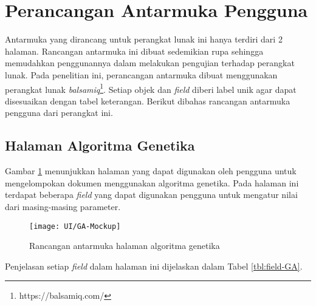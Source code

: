 \section{Perancangan Antarmuka Pengguna}
\label{sec:guidesign}
Antarmuka yang dirancang untuk perangkat lunak ini hanya terdiri dari 2 halaman. Rancangan antarmuka ini dibuat sedemikian rupa sehingga memudahkan penggunannya dalam melakukan pengujian terhadap perangkat lunak. Pada penelitian ini, perancangan antarmuka dibuat menggunakan perangkat lunak \textit{balsamiq}\footnote{https://balsamiq.com/}. Setiap objek dan \textit{field} diberi label unik agar dapat disesuaikan dengan tabel keterangan. Berikut dibahas rancangan antarmuka pengguna dari perangkat ini.

\subsection{Halaman Algoritma Genetika}
Gambar \ref{fig:UI-GA} menunjukkan halaman yang dapat digunakan oleh pengguna untuk mengelompokan dokumen menggunakan algoritma genetika. Pada halaman ini terdapat beberapa \textit{field} yang dapat digunakan pengguna untuk mengatur nilai dari masing-masing parameter.

\begin{figure}[H]
	\begin{center}
		\texttt{[image: UI/GA-Mockup]}
		\caption{Rancangan antarmuka halaman algoritma genetika}
		\label{fig:UI-GA}
	\end{center}
\end{figure}

Penjelasan setiap \textit{field} dalam halaman ini dijelaskan dalam Tabel \ref{tbl:field-GA}.

